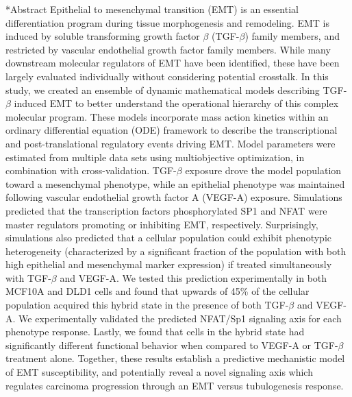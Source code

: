 \documentclass[12pt]{article}
\makeatletter
\renewcommand\section{\@startsection
	{subsection}{2}{0mm}
	{-0.2in}
	{0.05\baselineskip}
	{\normalfont\large\bfseries}}
\makeatother
\begin{document}
\section*{Abstract}
Epithelial to mesenchymal transition (EMT) is an essential differentiation program during tissue morphogenesis and remodeling.
EMT is induced by soluble transforming growth factor $\beta$ (TGF-$\beta$) family members, and restricted by vascular endothelial growth factor family members.
While many downstream molecular regulators of EMT have been identified, these have been largely evaluated individually without considering potential crosstalk.
In this study, we created an ensemble of dynamic mathematical models describing TGF-$\beta$ induced EMT to better understand the operational hierarchy of this complex molecular program.
These models incorporate mass action kinetics within an ordinary differential equation (ODE) framework to describe the transcriptional and post-translational regulatory events driving EMT.
Model parameters were estimated from multiple data sets using multiobjective optimization, in combination with cross-validation.
TGF-$\beta$ exposure drove the model population toward a mesenchymal phenotype, while an epithelial phenotype was maintained following vascular endothelial growth factor A (VEGF-A) exposure.
Simulations predicted that the transcription factors phosphorylated SP1 and NFAT were master regulators promoting or inhibiting EMT, respectively.
Surprisingly, simulations also predicted that a cellular population could exhibit phenotypic heterogeneity (characterized by a significant fraction of the population with both high epithelial and mesenchymal marker expression)
if treated simultaneously with TGF-$\beta$ and VEGF-A.  We tested this prediction experimentally in both MCF10A and DLD1 cells and found that upwards of 45\% of the cellular population acquired this hybrid state in the presence of both TGF-$\beta$ and VEGF-A.
We experimentally validated the predicted NFAT/Sp1 signaling axis for each phenotype response. Lastly, we found that cells in the hybrid state had significantly different functional behavior when compared to VEGF-A or TGF-$\beta$ treatment alone.
Together, these results establish a predictive mechanistic model of EMT susceptibility, and potentially reveal a novel signaling axis which regulates carcinoma progression through an EMT versus tubulogenesis response.
\end{document}
